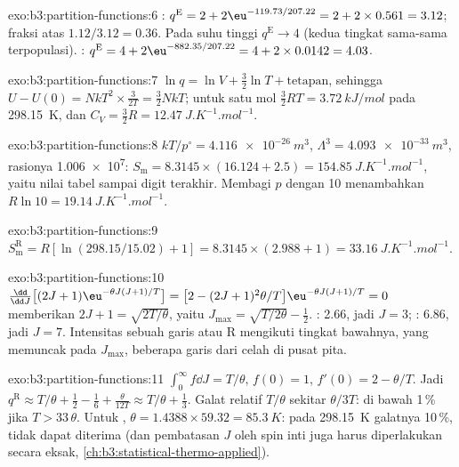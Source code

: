 \begin{solution}{exo:b3:partition-functions:6}
: $q^{\mathrm E} = 2 + 2\eu^{-119.73/207.22} = 2 + 2 \times 0.561 = 3.12$; fraksi atas
$1.12/3.12
= 0.36$. Pada suhu tinggi $q^{\mathrm E} \to 4$ (kedua tingkat sama-sama
terpopulasi). :
$q^{\mathrm E} = 4 + 2\eu^{-882.35/207.22} = 4 + 2 \times 0.0142 = 4.03$.
\end{solution}

\begin{solution}{exo:b3:partition-functions:7}
$\ln q = \ln V + \frac32\ln T + \text{tetapan}$, sehingga $U - U(0) = NkT^2 \times \frac{3}{2T} = \frac32NkT$;
untuk satu mol $\frac32RT = \qty{3.72}{kJ/mol}$ pada \qty{298.15}{K}, dan
$C_V = \frac32R = \qty{12.47}{J.K^{-1}.mol^{-1}}$.
\end{solution}

\begin{solution}{exo:b3:partition-functions:8}
$kT/p^\circ = \qty{4.116e-26}{m^3}$, $\Lambda^3 = \qty{4.093e-33}{m^3}$, rasionya \num{1.006e7}:
$S_{\mathrm m} = 8.3145 \times (16.124 + 2.5) = \qty{154.85}{J.K^{-1}.mol^{-1}}$, yaitu
nilai tabel sampai digit terakhir. Membagi $p$ dengan 10 menambahkan
$R\ln10 = \qty{19.14}{J.K^{-1}.mol^{-1}}$.
\end{solution}

\begin{solution}{exo:b3:partition-functions:9}
$S^{\mathrm R}_{\mathrm m} = R[\ln(298.15/15.02) + 1] = 8.3145 \times (2.988 + 1) = \qty{33.16}{J.K^{-1}.mol^{-1}}$.
\end{solution}

\begin{solution}{exo:b3:partition-functions:10}
$\frac{\dd}{\dd J}\bigl[(2J+1)\eu^{-\theta J(J+1)/T}\bigr] = \bigl[2 - (2J+1)^2\theta/T\bigr]\eu^{-\theta J(J+1)/T} = 0$
memberikan $2J + 1 = \sqrt{2T/\theta}$, yaitu $J_{\max} = \sqrt{T/2\theta} - \frac12$.
: 2.66, jadi $J = 3$; : 6.86, jadi $J = 7$. Intensitas sebuah
garis  atau R mengikuti  tingkat bawahnya, yang memuncak pada
$J_{\max}$, beberapa garis dari celah di pusat pita.
\end{solution}

\begin{solution}{exo:b3:partition-functions:11}
$\int_0^\infty f\dd J = T/\theta$, $f(0) = 1$, $f'(0) = 2 - \theta/T$. Jadi $q^{\mathrm R} \approx T/\theta + \frac12 -
\frac16 + \frac{\theta}{12T} \approx T/\theta + \frac13$. Galat relatif $T/\theta$
sekitar $\theta/3T$: di bawah 1\,\% jika $T > 33\,\theta$. Untuk ,
$\theta = 1.4388 \times 59.32 = \qty{85.3}{K}$: pada \qty{298.15}{K} galatnya
10\,\%, tidak dapat diterima (dan pembatasan $J$ oleh spin inti juga harus
diperlakukan secara eksak, \cref{ch:b3:statistical-thermo-applied}).
\end{solution}

